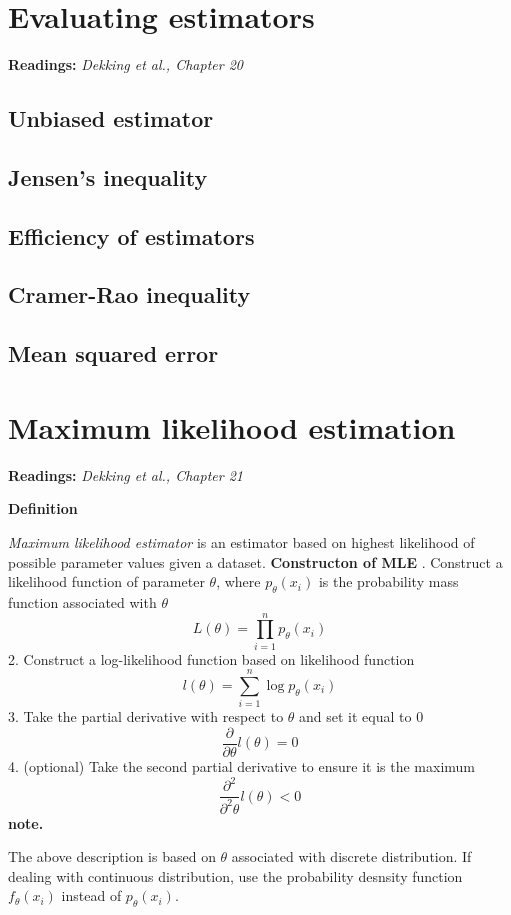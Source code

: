 \documentclass[a4paper]{article}
\begin{document}
\section{Evaluating estimators}
\textbf{Readings:} \textit{Dekking et al., Chapter 20}

\begin{mdframed}[style=Summary]
    
\end{mdframed}
\subsection{Unbiased estimator}
\subsection{Jensen's inequality}
\subsection{Efficiency of estimators}
\subsection{Cramer-Rao inequality}
\subsection{Mean squared error}
\newpage
\section{Maximum likelihood estimation}
\textbf{Readings:} \textit{Dekking et al., Chapter 21}

\begin{mdframed}[style=Summary]
    \textbf{Definition}
    
    \textit{Maximum likelihood estimator} is an estimator based on highest likelihood of possible parameter values given a dataset.
    \newline
    \textbf{Constructon of MLE}
    . Construct a likelihood function of parameter $\theta$, where $p_{\theta}(x_i)$ is the probability mass function associated with $\theta$
    $$L(\theta) = \prod_{i=1}^{n}p_{\theta}(x_i)$$    
    2. Construct a log-likelihood function based on likelihood function
    $$l(\theta) = \sum_{i=1}^{n}\log p_\theta(x_i)$$
    3. Take the partial derivative with respect to $\theta$ and set it equal to $0$
    $$\frac{\partial}{\partial\theta}l(\theta) = 0$$
    4. (optional) Take the second partial derivative to ensure it is the maximum
    $$\frac{\partial^2}{\partial^2\theta}l(\theta) < 0$$
    \newline
    \textbf{note.}
    
    The above description is based on $\theta$ associated with discrete distribution. If dealing with continuous distribution, use the probability desnsity function $f_{\theta}(x_i)$ instead of $p_{\theta}(x_i)$.
\end{mdframed}
\end{document}
